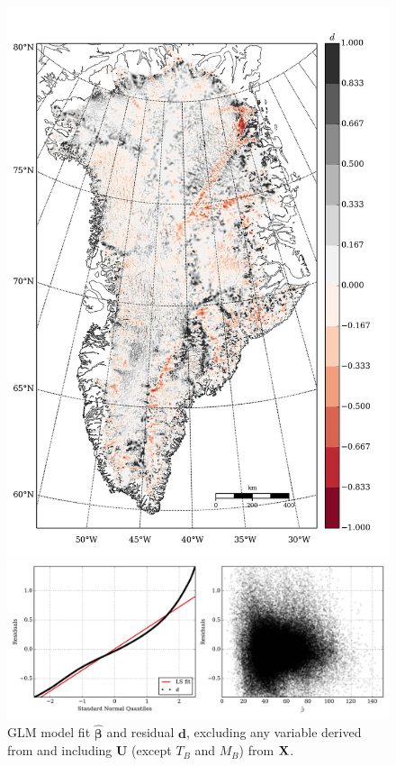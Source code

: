 \begin{figure}
\begin{minipage}[b]{0.47\linewidth}
    \includegraphics[width=1.0\textwidth]{images/greenland/stats/GLM_resid_no_velocity.jpg}
  \end{minipage}
  \begin{minipage}[b]{0.99\linewidth}
    \includegraphics[width=1.0\textwidth]{images/greenland/stats/GLM_resid-NQ_no_velocity.jpg}
  \end{minipage}
  \caption[]{GLM model fit $\bm{\hat{\beta}}$ and residual $\mathbf{d}$, excluding any variable derived from and including $\mathbf{U}$ (except $T_B$ and $M_B$) from $\mathbf{X}$.}
\end{figure}

